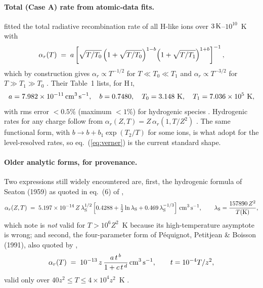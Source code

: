 \documentclass[11pt,a4paper]{article}
\newcommand{\cms}{\,{\rm cm^{3}\,s^{-1}}}
\begin{document}
\paragraph{Total (Case A) rate from atomic-data fits.}
\citet{Verner1996} fitted the total radiative recombination rate of all H-like ions over
$3\,{\rm K}$--$10^{10}$~K with
\begin{equation}
  \alpha_r(T) \;=\; a\left[\sqrt{T/T_0}\,
  \Bigl(1+\sqrt{T/T_0}\Bigr)^{1-b}
  \Bigl(1+\sqrt{T/T_1}\Bigr)^{1+b}\right]^{-1},
  \label{eq:verner}
\end{equation}
which by construction gives $\alpha_r\propto T^{-1/2}$ for $T\ll T_0\ll T_1$ and
$\alpha_r\propto T^{-3/2}$ for $T\gg T_1\gg T_0$ \citep{Verner1996}. Their Table~1 lists, for
H\,\textsc{i},
\begin{equation}
  a = 7.982\times10^{-11}\cms,\quad b=0.7480,\quad T_0=3.148\ {\rm K},\quad T_1=7.036\times10^{5}\ {\rm K},
  \label{eq:verner_HI}
\end{equation}
with rms error $<0.5\%$ (maximum $<1\%$) for hydrogenic species \citep{Verner1996}. Hydrogenic rates
for any charge follow from $\alpha_r(Z,T)=Z\,\alpha_r(1,T/Z^2)$ \citep{Verner1996}. The same
functional form, with $b\to b+b_1\exp(T_2/T)$ for some ions, is what \citet{Mao2016} adopt for the
level-resolved rates, so eq.~(\ref{eq:verner}) is the current standard shape.

\paragraph{Older analytic forms, for provenance.}
Two expressions still widely encountered are, first, the hydrogenic formula of Seaton (1959) as
quoted in eq.~(6) of \citet{Verner1996},
\begin{equation}
  \alpha_r(Z,T) \;=\; 5.197\times10^{-14}\,Z\,\lambda_{\rm S}^{1/2}
  \left[0.4288 + \tfrac{1}{2}\ln\lambda_{\rm S} + 0.469\,\lambda_{\rm S}^{-1/3}\right]\cms,
  \qquad \lambda_{\rm S}=\frac{157890\,Z^2}{T({\rm K})},
  \label{eq:seaton}
\end{equation}
which \citet{Verner1996} note is \emph{not} valid for $T>10^6Z^2$~K because its high-temperature
asymptote is wrong; and second, the four-parameter form of P\'equignot, Petitjean \& Boisson (1991),
also quoted by \citet{Verner1996},
\begin{equation}
  \alpha_r(T) \;=\; 10^{-13}\,z\,\frac{a\,t^{\,b}}{1+c\,t^{\,d}}\cms,
  \qquad t = 10^{-4}T/z^2,
  \label{eq:pequignot}
\end{equation}
valid only over $40z^2\le T\le4\times10^4z^2$~K \citep{Verner1996}.
\end{document}
